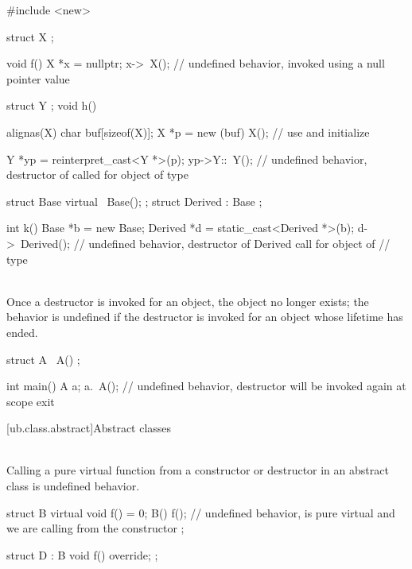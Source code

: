 \pnum
\begin{example}
\begin{codeblock}
#include <new>

struct X {};

void f() {
  X *x = nullptr;
  x->~X();              // undefined behavior, invoked using a null pointer value
}

struct Y {};
void h() {
  alignas(X) char buf[sizeof(X)];
  X *p = new (buf) X(); // use and initialize

  Y *yp = reinterpret_cast<Y *>(p);
  yp->Y::~Y();          // undefined behavior, destructor of  called for object of type 
}

struct Base {
  virtual ~Base();
};
struct Derived : Base {};

int k() {
  Base *b = new Base;
  Derived *d = static_cast<Derived *>(b);
  d->~Derived();        // undefined behavior, destructor of Derived call for object of
                        // type 
}
\end{codeblock}
\end{example}

\pnum
{} \\
Once a destructor is invoked for an object, the object no longer exists; the behavior is undefined if the
destructor is invoked for an object whose lifetime has ended.

\pnum
\begin{example}
\begin{codeblock}
struct A {
  ~A() {}
};

int main() {
  A a;
  a.~A();       // undefined behavior, destructor will be invoked again at scope exit
}
\end{codeblock}
\end{example}


[ub.class.abstract]{Abstract classes}

\pnum
{} \\
Calling a pure virtual function from a constructor or destructor in an abstract class is undefined behavior.

\pnum
\begin{example}
\begin{codeblock}
struct B {
  virtual void f() = 0;
  B() {
    f();        // undefined behavior,  is pure virtual and we are calling from the constructor
  }
};

struct D : B {
  void f() override;
};
\end{codeblock}
\end{example}


